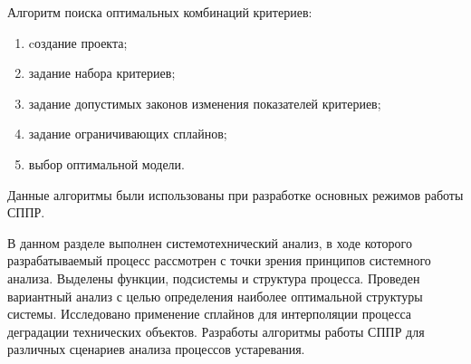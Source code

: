 Алгоритм поиска оптимальных комбинаций критериев:
\begin{enumerate}
  \item cоздание проекта;
  \item задание набора критериев;
  \item задание допустимых законов изменения показателей критериев;
  \item задание ограничивающих сплайнов;
  \item выбор оптимальной модели.
\end{enumerate}

Данные алгоритмы были использованы при разработке основных режимов работы СППР.

В данном разделе выполнен системотехнический анализ, в ходе которого разрабатываемый процесс рассмотрен с точки зрения принципов системного анализа. 
Выделены функции, подсистемы и структура процесса. 
Проведен вариантный анализ с целью определения наиболее оптимальной структуры системы. 
Исследовано применение сплайнов для интерполяции процесса деградации технических объектов.
Разработы алгоритмы работы СППР для различных сценариев анализа процессов устаревания.







